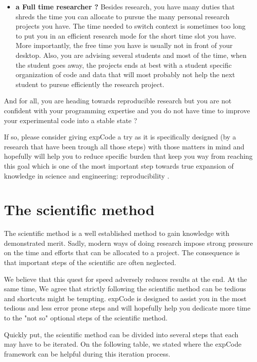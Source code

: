 \documentclass[10pt,a4paper,fleqn]{article}
\newcommand{\expcode}{\textsf{expCode} }
\begin{document}
\begin{itemize}
\item \textbf{a Full time researcher ?} Besides research, you have many duties that shreds the time you can allocate to pursue the many personal research projects you have. The time needed to switch context is sometimes too long to put you in an efficient research mode for the short time slot you have. More importantly, the free time you have is usually not in front of your desktop. Also, you are advising several students and most of the time, when the student goes away, the projects ends at best with a student specific organization of code and data that will most probably not help the next student to pursue efficiently the research project.

\end{itemize}

And for all, you are heading towards reproducible research \cite{} but you are not confident with your programming expertise and you do not have time to improve your experimental code into a stable state ?

If so, please consider giving \expcode a try as it is specifically designed (by a research that have been trough all those steps) with those matters in mind and hopefully will help you to reduce specific burden that keep you way from reaching this goal which is one of the most important step towards true expansion of knowledge in science and engineering: reproducibility \cite{}.

\section{The scientific method}

The scientific method is a well established method to gain knowledge with demonstrated merit. Sadly, modern ways of doing research impose strong pressure on the time and efforts that can be allocated to a project. The consequence is that important steps of the scientific are often neglected. 

We believe that this quest for speed adversely reduces results at the end. At the same time, We agree that strictly following the scientific method can be tedious and shortcuts might be tempting. \expcode is designed to assist you in the most tedious and less error prone steps and will hopefully help you dedicate more time to the "not so" optional steps of the scientific method.

Quickly put, the scientific method can be divided into several steps that each may have to be iterated. On the following table, we stated where the \expcode framework can be helpful during this iteration process.
\end{document}
